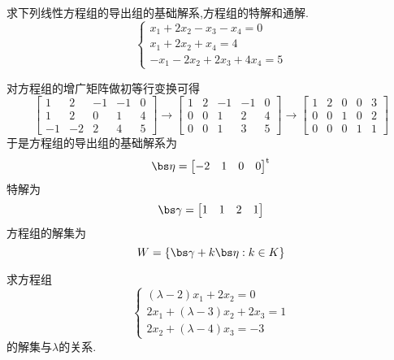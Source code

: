 \documentclass{ctexart}
\begin{document}
\pagestyle{empty}
\begin{center}
\end{center}
\begin{homework}[1]
    求下列线性方程组的导出组的基础解系,方程组的特解和通解.
    \[\left\{\begin{array}{l}
        x_1+2x_2-x_3-x_4=0\\
        x_1+2x_2+x_4=4\\
        -x_1-2x_2+2x_3+4x_4=5
    \end{array}\right.\]
\end{homework}
\begin{solution}
    对方程组的增广矩阵做初等行变换可得
    \[\begin{bmatrix}
        1&2&-1&-1&0\\
        1&2&0&1&4\\
        -1&-2&2&4&5
    \end{bmatrix}\longrightarrow\begin{bmatrix}
        1&2&-1&-1&0\\
        0&0&1&2&4\\
        0&0&1&3&5
    \end{bmatrix}\longrightarrow\begin{bmatrix}
        1&2&0&0&3\\
        0&0&1&0&2\\
        0&0&0&1&1
    \end{bmatrix}\]
    于是方程组的导出组的基础解系为
    \[\bs\eta=\begin{bmatrix}
        -2&1&0&0
    \end{bmatrix}^{\text{t}}\]
    特解为
    \[\bs\gamma=\begin{bmatrix}
        1&1&2&1
    \end{bmatrix}\]
    方程组的解集为
    \[W=\left\{\bs\gamma+k\bs\eta:k\in K\right\}\]
\end{solution}
\begin{homework}[2]
    求方程组
    \[\left\{\begin{array}{l}
        (\lambda-2)x_1+2x_2=0\\
        2x_1+(\lambda-3)x_2+2x_3=1\\
        2x_2+(\lambda-4)x_3=-3
    \end{array}\right.\]
    的解集与$\lambda$的关系.
\end{homework}
\end{document}
